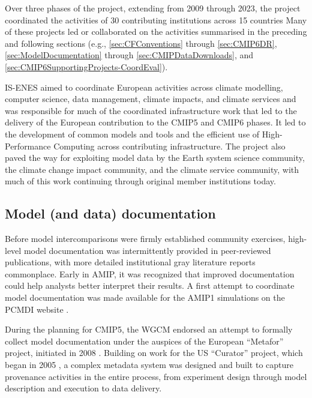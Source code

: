 \documentclass[manuscript]{copernicus}
\def\cred#1{{\color{red}#1}}
\begin{document}
Over three phases of the project, extending from 2009 through 2023, the project coordinated the activities of 30 contributing institutions across 15 countries Many of these projects led or collaborated on the activities summarised in the preceding and following sections (e.g., \autoref{sec:CFConventions} through \autoref{sec:CMIP6DR}, \autoref{sec:ModelDocumentation} through \autoref{sec:CMIPDataDownloads}, and \autoref{sec:CMIP6SupportingProjects-CoordEval}).

IS-ENES aimed to coordinate European activities across climate modelling, computer science, data management, climate impacts, and climate services and was responsible for much of the coordinated infrastructure work that led to the delivery of the European contribution to the CMIP5 and CMIP6 phases. It led to the development of common models and tools and the efficient use of High-Performance Computing across contributing infrastructure. The project also paved the way for exploiting model data by the Earth system science community, the climate change impact community, and the climate service community, with much of this work continuing through original member institutions today.


\subsection{Model (and data) documentation}
\label{sec:ModelDocumentation}

Before model intercomparisons were firmly established community exercises, high-level model documentation was intermittently provided in peer-reviewed publications, with more detailed institutional gray literature reports commonplace. Early in AMIP, it was recognized that improved documentation could help analysts better interpret their results. A first attempt to coordinate model documentation was made available for the AMIP1 simulations on the PCMDI website \citep{phillips_documentation_1996}.

During the planning for CMIP5, the WGCM endorsed an attempt to formally collect model documentation under the auspices of the European ``Metafor'' project, initiated in 2008 \citep{guilyardi_cmip5_2011,lawrence_describing_2012}. Building on work for the US ``Curator'' project, which began in 2005 \citep{dunlap_earth_2008}, a complex metadata system was designed and built to capture provenance activities in the entire process, from experiment design through model description and execution to data delivery. 
\end{document}

